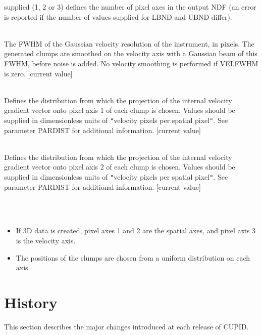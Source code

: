 \documentclass[twoside,11pt]{article}
\newcommand{\stardocinitials}  {SUN}
\newcommand{\stardocnumber}    {255.1}
\newcommand{\stardocname}{\stardocinitials /\stardocnumber}
\renewcommand{\_}{\texttt{\symbol{95}}}
\newcommand{\sstsubsection}[1]{ \item[{#1}] \mbox{} \\}
\newcommand{\sstnotes}[1]{\item[Notes:] \mbox{} \\[1.3ex] #1}
\newcommand{\sstitemlist}[1]{
  \mbox{} \\
  \vspace{-3.5ex}
  \begin{itemize}
     #1
  \end{itemize}
}
\newcommand{\sstitem}{\item}
\newcommand{\sstsubsection}[1]{\item[{#1}]}
\newcommand{\sstnotes}[1]{\item[Notes:] #1 }
\newcommand{\sstitemlist}[1]{
      \begin{itemize}
         #1
      \end{itemize}
      \\
   }
\newcommand{\sstitem}{\item}
\begin{document}
{{{         supplied (1, 2 or 3) defines the number of pixel axes in the output
         NDF (an error is reported if the number of values supplied for LBND
         and UBND differ).
      }
      \sstsubsection{
         VELFWHM = \_REAL (Read)
      }{
         The FWHM of the Gaussian velocity resolution of the instrument, in
         pixels. The generated clumps are smoothed on the velocity axis with
         a Gaussian beam of this FWHM, before noise is added. No velocity
         smoothing is performed if VELFWHM is zero. [current value]
      }
      \sstsubsection{
         VGRAD1( 2 ) = \_REAL (Read)
      }{
         Defines the distribution from which the projection of the internal
         velocity gradient vector onto pixel axis 1 of each clump is chosen.
         Values should be supplied in dimensionless units of {\tt "}velocity
         pixels per spatial pixel{\tt "}. See parameter PARDIST for additional
         information. [current value]
      }
      \sstsubsection{
         VGRAD2( 2 ) = \_REAL (Read)
      }{
         Defines the distribution from which the projection of the internal
         velocity gradient vector onto pixel axis 2 of each clump is chosen.
         Values should be supplied in dimensionless units of {\tt "}velocity
         pixels per spatial pixel{\tt "}. See parameter PARDIST for additional
         information. [current value]
      }
   }
   \sstnotes{
      \sstitemlist{

         \sstitem
         If 3D data is created, pixel axes 1 and 2 are the spatial axes,
         and pixel axis 3 is the velocity axis.

         \sstitem
         The positions of the clumps are chosen from a uniform
         distribution on each axis.
      }
   }
}

\newpage
\markboth{\stardocname}{\stardocname}

\section{\label{APP:HISTORY}History}
This section describes the major changes introduced at each release of
CUPID.


\newpage
\end{document}
